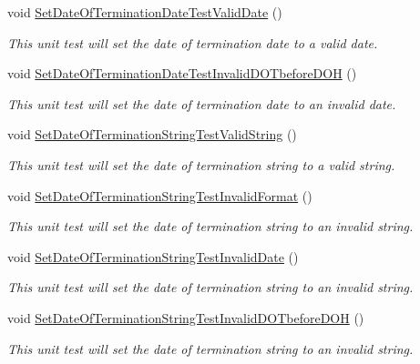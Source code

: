 \begin{DoxyCompactItemize}
void \hyperlink{class_my_all_employee_1_1_tests_1_1_parttime_employee_tests_aa2ca527e770931b43f6353f68ed6b109}{Set\+Date\+Of\+Termination\+Date\+Test\+Valid\+Date} ()
\begin{DoxyCompactList}\small\item\em This unit test will set the date of termination date to a valid date. \end{DoxyCompactList}\item 
void \hyperlink{class_my_all_employee_1_1_tests_1_1_parttime_employee_tests_a25ab537e746d046721b346fedf0a7455}{Set\+Date\+Of\+Termination\+Date\+Test\+Invalid\+D\+O\+Tbefore\+D\+O\+H} ()
\begin{DoxyCompactList}\small\item\em This unit test will set the date of termination date to an invalid date. \end{DoxyCompactList}\item 
void \hyperlink{class_my_all_employee_1_1_tests_1_1_parttime_employee_tests_a3713ed1297ae952202955d529d4a4629}{Set\+Date\+Of\+Termination\+String\+Test\+Valid\+String} ()
\begin{DoxyCompactList}\small\item\em This unit test will set the date of termination string to a valid string. \end{DoxyCompactList}\item 
void \hyperlink{class_my_all_employee_1_1_tests_1_1_parttime_employee_tests_ad580c5170feee540d2cd2008e7c54a66}{Set\+Date\+Of\+Termination\+String\+Test\+Invalid\+Format} ()
\begin{DoxyCompactList}\small\item\em This unit test will set the date of termination string to an invalid string. \end{DoxyCompactList}\item 
void \hyperlink{class_my_all_employee_1_1_tests_1_1_parttime_employee_tests_a22bdea19ca3266a5e54c0792bf6b7ff7}{Set\+Date\+Of\+Termination\+String\+Test\+Invalid\+Date} ()
\begin{DoxyCompactList}\small\item\em This unit test will set the date of termination string to an invalid string. \end{DoxyCompactList}\item 
void \hyperlink{class_my_all_employee_1_1_tests_1_1_parttime_employee_tests_a73d08e15b8eb651bbc09e7aca26cd65f}{Set\+Date\+Of\+Termination\+String\+Test\+Invalid\+D\+O\+Tbefore\+D\+O\+H} ()
\begin{DoxyCompactList}\small\item\em This unit test will set the date of termination string to an invalid string. \end{DoxyCompactList}\item 

\end{DoxyCompactItemize}
